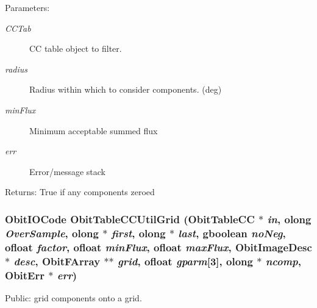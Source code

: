 \begin{Desc}
\item[Parameters:]
\begin{description}
\item[{\em CCTab}]CC table object to filter. \item[{\em radius}]Radius within which to consider components. (deg) \item[{\em min\-Flux}]Minimum acceptable summed flux \item[{\em err}]Error/message stack \end{description}
\end{Desc}
\begin{Desc}
\item[Returns:]True if any components zeroed \end{Desc}
\subsubsection{\setlength{\rightskip}{0pt plus 5cm}Obit\-IOCode Obit\-Table\-CCUtil\-Grid ({\bf Obit\-Table\-CC} $\ast$ {\em in}, {\bf olong} {\em Over\-Sample}, {\bf olong} $\ast$ {\em first}, {\bf olong} $\ast$ {\em last}, gboolean {\em no\-Neg}, {\bf ofloat} {\em factor}, {\bf ofloat} {\em min\-Flux}, {\bf ofloat} {\em max\-Flux}, {\bf Obit\-Image\-Desc} $\ast$ {\em desc}, {\bf Obit\-FArray} $\ast$$\ast$ {\em grid}, {\bf ofloat} {\em gparm}[3], {\bf olong} $\ast$ {\em ncomp}, {\bf Obit\-Err} $\ast$ {\em err})}\label{ObitTableCCUtil_8c_a6}


Public: grid components onto a grid. 

